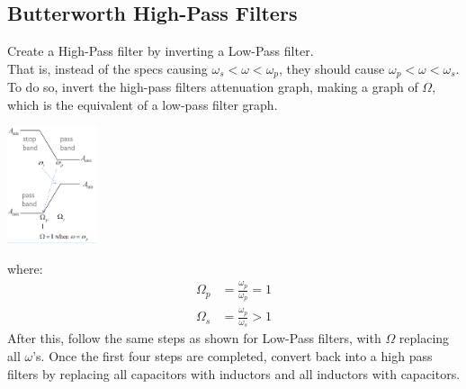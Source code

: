 \documentclass[nobib]{tufte-handout}
\begin{document}
\subsection{Butterworth High-Pass Filters}
Create a High-Pass filter by inverting a Low-Pass filter.\\ That is, instead of
the specs causing $\omega_s<\omega<\omega_p$, they should cause
$\omega_p<\omega<\omega_s$.\\ To do so, invert the high-pass filters
attenuation graph, making a graph of $\Omega$, which is the equivalent of a
low-pass filter graph.\\
\begin{center}
    \includegraphics[width = 100px]{images/hpf_bode_design.png}
\end{center}
where:
\begin{align*}
    \Omega_p & = \frac{\omega_p}{\omega_p}=1 \\
    \Omega_s & = \frac{\omega_p}{\omega_s}>1
\end{align*}
After this, follow the same steps as shown for Low-Pass filters, with $\Omega$ replacing all $\omega$'s.
Once the first four steps are completed, convert back into a high pass filters by replacing all capacitors with inductors and all inductors with capacitors.\\
\end{document}
